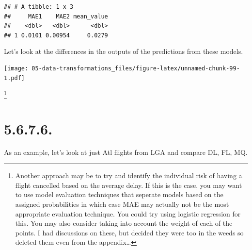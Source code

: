 \documentclass[]{book}
\newenvironment{Shaded}{\begin{snugshade}}{\end{snugshade}}
\newcommand{\DataTypeTok}[1]{\textcolor[rgb]{0.13,0.29,0.53}{#1}}
\newcommand{\DecValTok}[1]{\textcolor[rgb]{0.00,0.00,0.81}{#1}}
\newcommand{\KeywordTok}[1]{\textcolor[rgb]{0.13,0.29,0.53}{\textbf{#1}}}
\newcommand{\NormalTok}[1]{#1}
\newcommand{\OperatorTok}[1]{\textcolor[rgb]{0.81,0.36,0.00}{\textbf{#1}}}
\newcommand{\StringTok}[1]{\textcolor[rgb]{0.31,0.60,0.02}{#1}}
\let\rmarkdownfootnote\footnote%
\def\footnote{\protect\rmarkdownfootnote}
\theoremstyle{definition}
\theoremstyle{definition}
\theoremstyle{definition}
\theoremstyle{remark}
\begin{document}
\begin{verbatim}
## # A tibble: 1 x 3
##     MAE1    MAE2 mean_value
##    <dbl>   <dbl>      <dbl>
## 1 0.0101 0.00954     0.0279
\end{verbatim}

Let's look at the differences in the outputs of the predictions from
these models.

\begin{Shaded}
\end{Shaded}

\texttt{[image: 05-data-transformations\_files/figure-latex/unnamed-chunk-99-1.pdf]}

\footnote{Another approach may be to try and identify the individual
  risk of having a flight cancelled based on the average delay. If this
  is the case, you may want to use model evaluation techniques that
  seperate models based on the assigned probabilities in which case MAE
  may actually not be the most appropriate evaluation technique. You
  could try using logistic regression for this. You may also consider
  taking into account the weight of each of the points. I had
  discussions on these, but decided they were too in the weeds so
  deleted them even from the appendix\ldots{}}

\hypertarget{section-17}{%
\section{5.6.7.6.}\label{section-17}}

As an example, let's look at just Atl flights from LGA and compare DL,
FL, MQ.
\end{document}
